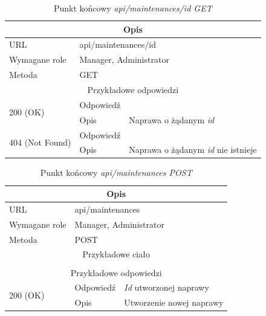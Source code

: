 \documentclass[eng,printmode,openany]{mgr}
\begin{document}
	\begin{table}[H]
		\caption{Punkt końcowy \textit{api/maintenances/id GET}}
		\begin{tabularx}{\textwidth}{|l|l|X|}
			\hline
			\multicolumn{3}{|c|}{Opis}                         						\\ \hline
			URL                       & \multicolumn{2}{l|}{api/maintenances/id} 	\\ \hline
			Wymagane role             & \multicolumn{2}{l|}{Manager, Administrator}               \\ \hline
			Metoda                    & \multicolumn{2}{l|}{GET} 					\\ \hline
			\multicolumn{3}{|c|}{ Przykładowe odpowiedzi}                   		\\ \hline
			\multirow{2}{*}{200 (OK)} 			& Odpowiedź    	&        \\ \cline{2-3} 
			& Opis         	& Naprawa o żądanym \textit{id}      									                    \\ \hline
			\multirow{2}{*}{404 (Not Found)} 	& Odpowiedź     &    \\ \cline{2-3} 
			& Opis          & Naprawa o żądanym \textit{id} nie istnieje      									        \\ \hline
		\end{tabularx}
	\end{table}
	
	\begin{table}[H]
		\caption{Punkt końcowy \textit{api/maintenances POST}}
		\begin{tabularx}{\textwidth}{|l|l|X|}
			\hline
			\multicolumn{3}{|c|}{Opis}                         						\\ \hline
			URL                       & \multicolumn{2}{l|}{api/maintenances} 	    \\ \hline
			Wymagane role             & \multicolumn{2}{l|}{Manager, Administrator} \\ \hline
			Metoda                    & \multicolumn{2}{l|}{POST} 					\\ \hline
			\multicolumn{3}{|c|}{Przykładowe ciało}         						\\ \hline
			\multicolumn{3}{|c|}{} 		    \\ \hline
			\multicolumn{3}{|c|}{ Przykładowe odpowiedzi}                   		                        \\ \hline
			\multirow{2}{*}{200 (OK)} 			& Odpowiedź     &  \textit{Id} utworzonej naprawy           \\ \cline{2-3} 
			& Opis         	& Utworzenie nowej naprawy     						    \\ \hline
		\end{tabularx}
	\end{table}
	
\end{document}
